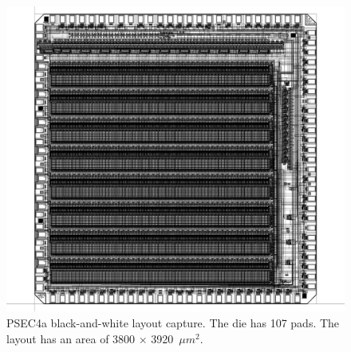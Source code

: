 \documentclass[12pt]{article}
\begin{document}
\begin{figure}[h!]
    \begin{center}
      \includegraphics[width=17.5cm]{fig/psec4a_layout_capture}

    \end{center}
    \caption{PSEC4a black-and-white layout capture. The die has 107 pads. The layout has an area of 3800 $\times$ 3920~$\mu$$m^2$.}
    \label{fig:layout}
\end{figure}



%
%
%
%
%
%
%
%
%
%
%
\end{document}
